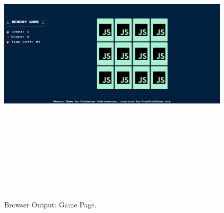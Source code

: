 \documentclass[12pt, a4]{article}
\begin{document}
\subsection*{}
\begin{figure}[h]
\centering
\caption{Browser Output: Game Page.}
\includegraphics[height=15cm, width=18cm]{Output/MemGame.png}
\end{figure}

\newpage
\end{document}
